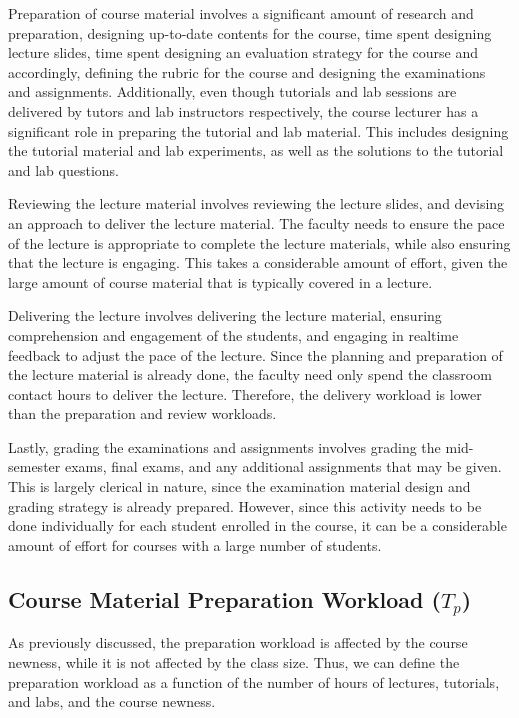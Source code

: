 Preparation of course material involves a significant amount of research and preparation, designing up-to-date contents for the course, time spent designing lecture slides, time spent designing an evaluation strategy for the course and accordingly, defining the rubric for the course and designing the examinations and assignments. Additionally, even though tutorials and lab sessions are delivered by tutors and lab instructors respectively, the course lecturer has a significant role in preparing the tutorial and lab material. This includes designing the tutorial material and lab experiments, as well as the solutions to the tutorial and lab questions.

Reviewing the lecture material involves reviewing the lecture slides, and devising an approach to deliver the lecture material. The faculty needs to ensure the pace of the lecture is appropriate to complete the lecture materials, while also ensuring that the lecture is engaging. This takes a considerable amount of effort, given the large amount of course material that is typically covered in a lecture.

Delivering the lecture involves delivering the lecture material, ensuring comprehension and engagement of the students, and engaging in realtime feedback to adjust the pace of the lecture. Since the planning and preparation of the lecture material is already done, the faculty need only spend the classroom contact hours to deliver the lecture. Therefore, the delivery workload is lower than the preparation and review workloads.

Lastly, grading the examinations and assignments involves grading the mid-semester exams, final exams, and any additional assignments that may be given. This is largely clerical in nature, since the examination material design and grading strategy is already prepared. However, since this activity needs to be done individually for each student enrolled in the course, it can be a considerable amount of effort for courses with a large number of students.

\subsection{Course Material Preparation Workload (\(T_p\))}
\label{sec:preparation_of_course_material}

As previously discussed, the preparation workload is affected by the course newness, while it is not affected by the class size. Thus, we can define the preparation workload as a function of the number of hours of lectures, tutorials, and labs, and the course newness.

